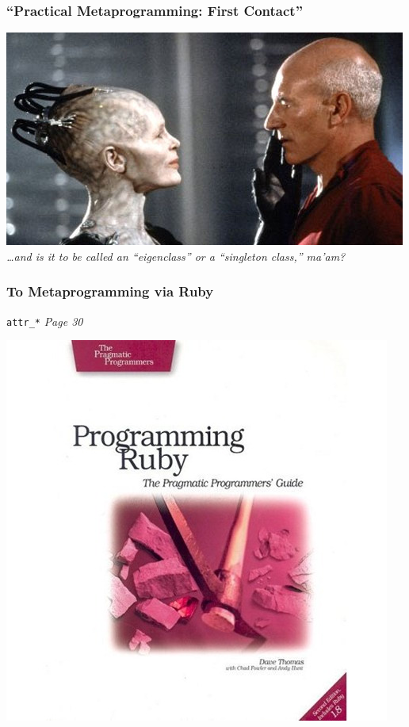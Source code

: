 \documentclass[slidestop,compress,mathserif]{beamer}
\begin{document}
\begin{frame} 
	\frametitle{``Practical Metaprogramming:  First Contact''}
	\includegraphics[scale=0.55]{img/first_contact.jpg} \\
	\emph{\ldots and is it to be called an ``eigenclass'' or a ``singleton class,'' ma'am?}
\end{frame} 

\begin{frame} \frametitle{To Metaprogramming via Ruby}
	\texttt{attr\_*} \emph{Page 30}
	\vskip 0.5cm
	\begin{center}
		\includegraphics[scale=0.45]{img/ruby_pickaxe.jpg}	
	\end{center}
\end{frame} 
\end{document}

